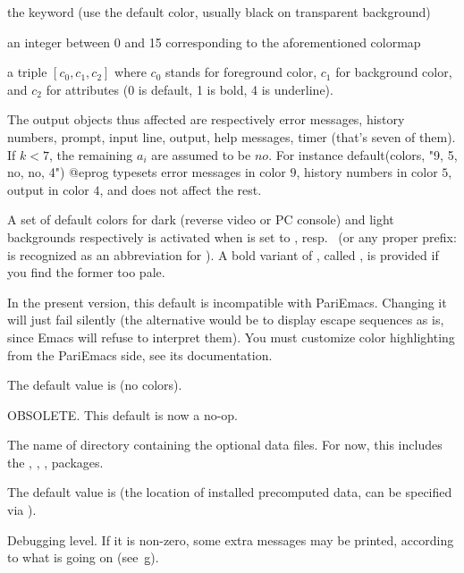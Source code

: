 {\noindent\item the keyword  (use the default color, usually
black on transparent background)

\noindent\item an integer between 0 and 15 corresponding to the
aforementioned colormap

\noindent\item a triple $[c_0,c_1,c_2]$ where $c_0$ stands for foreground
color, $c_1$ for background color, and $c_2$ for attributes (0 is default, 1
is bold, 4 is underline).

The output objects thus affected are respectively error messages,
history numbers, prompt, input line, output, help messages, timer (that's
seven of them). If $k < 7$, the remaining $a_i$ are assumed to be $no$. For
instance
%
\bprog
default(colors, "9, 5, no, no, 4")
@eprog
\noindent
typesets error messages in color $9$, history numbers in color $5$, output in
color $4$, and does not affect the rest.

A set of default colors for dark (reverse video or PC console) and light
backgrounds respectively is activated when  is set to
, resp.~ (or any proper prefix:  is
recognized as an abbreviation for ). A bold variant of
, called , is provided if you find the former too
pale.

\emacs In the present version, this default is incompatible with PariEmacs.
Changing it will just fail silently (the alternative would be to display
escape sequences as is, since Emacs will refuse to interpret them).
You must customize color highlighting from the PariEmacs side, see its
documentation.

The default value is  (no colors).

\label{se:def,compatible}
OBSOLETE. This default is now a no-op.

\label{se:def,datadir}
The name of directory containing the optional data files. For now,
this includes the , , , 
packages.

The default value is \datadir (the location of installed precomputed data,
can be specified via ).

\label{se:def,debug}
Debugging level. If it is non-zero, some extra messages may be printed,
according to what is going on (see~\b{g}).

}
